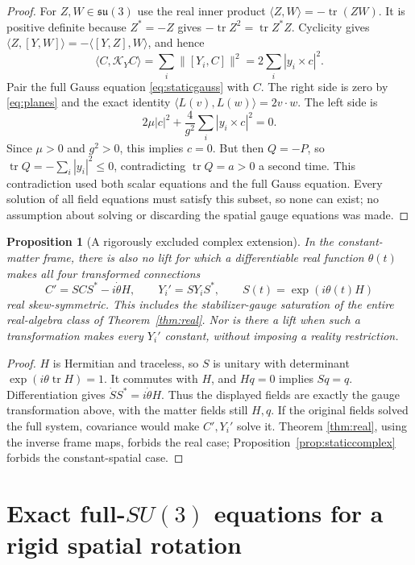 \documentclass[11pt]{article}
\newtheorem{proposition}[theorem]{Proposition}
\newcommand{\su}{\mathfrak{su}}
\newcommand{\tr}{\operatorname{tr}}
\begin{document}
\begin{proof}
For $Z,W\in\su(3)$ use the real inner product
$\langle Z,W\rangle=-\tr(ZW)$. It is positive definite because
$Z^*=-Z$ gives $-\tr Z^2=\tr Z^*Z$.
Cyclicity gives
$\langle Z,[Y,W]\rangle=-\langle[Y,Z],W\rangle$, and hence
\[
 \langle C,\mathcal K_Y C\rangle
 =\sum_i\|[Y_i,C]\|^2
 =2\sum_i|y_i\times c|^2.
\]
Pair the full Gauss equation \eqref{eq:staticgauss} with $C$.
The right side is zero by \eqref{eq:planes} and the exact identity
$\langle L(v),L(w)\rangle=2v\cdot w$.
The left side is
\[
 2\mu|c|^2+\frac4{g^2}\sum_i|y_i\times c|^2=0.
\]
Since $\mu>0$ and $g^2>0$, this implies $c=0$.
But then $Q=-P$, so $\tr Q=-\sum_i|y_i|^2\leq0$, contradicting
$\tr Q=a>0$ a second time. This contradiction used both scalar equations
and the full Gauss equation. Every solution of all field equations must
satisfy this subset, so none can exist; no assumption about solving or
discarding the spatial gauge equations was made.
\end{proof}

\begin{proposition}[A rigorously excluded complex extension]\label{prop:saturation}
In the constant-matter frame, there is also no lift for which a
differentiable real function $\theta(t)$ makes all four transformed
connections
\[
 C'=SCS^*-i\dot\theta H,\qquad Y_i'=SY_iS^*,\qquad
 S(t)=\exp(i\theta(t)H)
\]
real skew-symmetric. This includes the stabilizer-gauge saturation of
the entire real-algebra class of Theorem~\ref{thm:real}.
Nor is there a lift when such a transformation makes every $Y_i'$ constant,
without imposing a reality restriction.
\end{proposition}
\begin{proof}
$H$ is Hermitian and traceless, so $S$ is unitary with determinant
$\exp(i\theta\tr H)=1$. It commutes with $H$, and $Hq=0$ implies
$Sq=q$. Differentiation gives $\dot S S^*=i\dot\theta H$.
Thus the displayed fields are exactly the gauge transformation above,
with the matter fields still $H,q$. If the original fields solved the
full system, covariance would make $C',Y_i'$ solve it. Theorem
\ref{thm:real}, using the inverse frame maps, forbids the real case;
Proposition~\ref{prop:staticcomplex} forbids the constant-spatial case.
\end{proof}

\section{Exact full-$SU(3)$ equations for a rigid spatial rotation}
\end{document}
